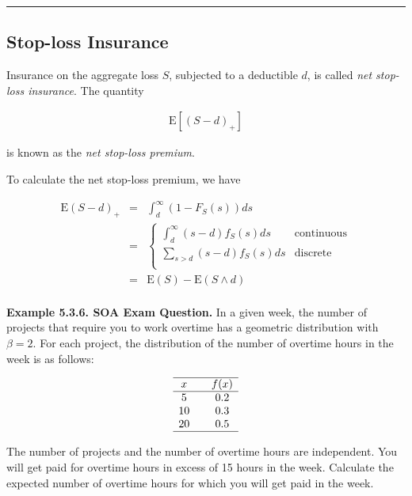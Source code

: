\documentclass[]{book}
\theoremstyle{definition}
\theoremstyle{definition}
\theoremstyle{definition}
\theoremstyle{remark}
\begin{document}
\begin{center}\rule{0.5\linewidth}{\linethickness}\end{center}

\subsection{Stop-loss Insurance}\label{stop-loss-insurance}

Insurance on the aggregate loss \(S\), subjected to a deductible \(d\),
is called \textit{net stop-loss insurance}. The quantity

\begin{eqnarray*}
\mathrm{E}[(S-d)_+]
\end{eqnarray*}

is known as the \emph{net stop-loss premium}.

To calculate the net stop-loss premium, we have

\begin{eqnarray*}
\mathrm{E}(S-d)_+  & =& \int_{d}^{\infty} \left(1-F_S(s) \right) ds\\
&=&
\left\{\begin{array}{ll}
\int_{d}^{\infty}(s-d) f_{S}(s) ds& \text{continuous}\\
 \sum_{s>d}(s-d) f_{S}(s) ds & \text{discrete}\\
 \end{array}\right.\\
&=& \mathrm{E}(S) - \mathrm{E}(S\wedge d)\\
\end{eqnarray*}

\textbf{Example 5.3.6. SOA Exam Question.} In a given week, the number
of projects that require you to work overtime has a geometric
distribution with \(\beta=2\). For each project, the distribution of the
number of overtime hours in the week is as follows:

\[\begin{matrix}
\begin{array}{ccc} \hline
    x &  & f(x)\\ \hline
    5 &  & 0.2 \\
    10 & & 0.3 \\
    20 & & 0.5\\ \hline
  \end{array}
\end{matrix}\]

The number of projects and the number of overtime hours are independent.
You will get paid for overtime hours in excess of 15 hours in the week.
Calculate the expected number of overtime hours for which you will get
paid in the week.
\end{document}
